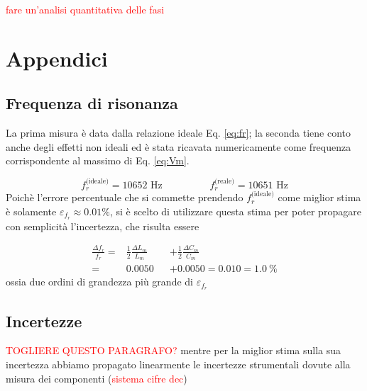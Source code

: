 \documentclass[12pt,italian]{article}
\newcommand{\err}[1]{\textcolor{red}{#1}}
\begin{document}
\err{fare un'analisi quantitativa delle fasi}

\appendix
\section{Appendici}
\subsection{Frequenza di risonanza}\label{sec:resFreq}
La prima misura è data dalla relazione ideale Eq. \eqref{eq:fr}; la seconda
tiene conto anche degli effetti non ideali ed è stata ricavata numericamente
come frequenza corrispondente al massimo di Eq. \eqref{eq:Vm}.

\begin{equation*}
	f_{r}^{\text{(ideale)}} = 10652 \text{ Hz} \hspace{2cm} f_{r}^{\text{(reale)}} = 10651 \text{ Hz}
\end{equation*}
Poichè l'errore percentuale che si commette prendendo $f_{r}^{\text{(ideale)}}$
come miglior stima è solamente $\varepsilon_{f_r} \approx 0.01\%$, si è scelto
di utilizzare questa stima per poter propagare con semplicità l'incertezza, che
risulta essere

\begin{equation*}
	\begin{alignedat}{2}
		\frac{\Delta f_{r}}{f_{r}} = & \frac{1}{2} \frac{\Delta L_{m}}{L_{m}} &  & + \frac{1}{2} \frac{\Delta C_{m}}{C_{m}} \\
		=                            & 0.0050                                 &  & + 0.0050
		= 0.010 = 1.0 \ \%
	\end{alignedat}
\end{equation*}
ossia due ordini di grandezza più grande di $\varepsilon_{f_r}$

\subsection{Incertezze}

\noindent
\err{TOGLIERE QUESTO PARAGRAFO?}
mentre per la miglior stima sulla sua incertezza abbiamo propagato linearmente
le incertezze strumentali dovute alla misura dei componenti (\err{sistema cifre dec})
\end{document}

